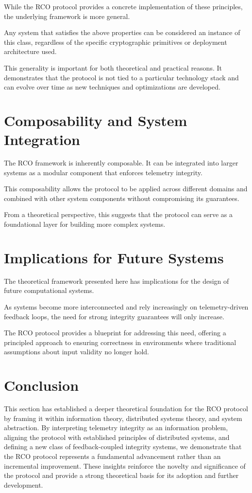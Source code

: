 While the RCO protocol provides a concrete implementation of these principles, the underlying framework is more general.

Any system that satisfies the above properties can be considered an instance of this class, regardless of the specific cryptographic primitives or deployment architecture used.

This generality is important for both theoretical and practical reasons. It demonstrates that the protocol is not tied to a particular technology stack and can evolve over time as new techniques and optimizations are developed.

\section{Composability and System Integration}

The RCO framework is inherently composable. It can be integrated into larger systems as a modular component that enforces telemetry integrity.

This composability allows the protocol to be applied across different domains and combined with other system components without compromising its guarantees.

From a theoretical perspective, this suggests that the protocol can serve as a foundational layer for building more complex systems.

\section{Implications for Future Systems}

The theoretical framework presented here has implications for the design of future computational systems.

As systems become more interconnected and rely increasingly on telemetry-driven feedback loops, the need for strong integrity guarantees will only increase.

The RCO protocol provides a blueprint for addressing this need, offering a principled approach to ensuring correctness in environments where traditional assumptions about input validity no longer hold.

\section{Conclusion}

This section has established a deeper theoretical foundation for the RCO protocol by framing it within information theory, distributed systems theory, and system abstraction. By interpreting telemetry integrity as an information problem, aligning the protocol with established principles of distributed systems, and defining a new class of feedback-coupled integrity systems, we demonstrate that the RCO protocol represents a fundamental advancement rather than an incremental improvement. These insights reinforce the novelty and significance of the protocol and provide a strong theoretical basis for its adoption and further development.

